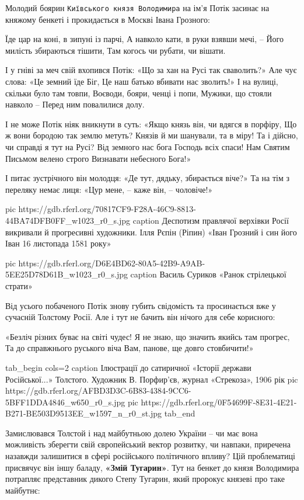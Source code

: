 Молодий боярин \verb|Київського князя Володимира| на ім’я Потік засинає на княжому
бенкеті і прокидається в Москві Івана Грозного:

\begin{multicols}{2}
  \obeycr
Їде цар на коні, в зипуні із парчі,
А навколо кати, в руки взявши мечі, –
Його милість збираються тішити,
Там когось чи рубати, чи вішати.

І у гніві за меч свій вхопився Потік:
«Що за хан на Русі так сваволить?»
Але чує слова: «Це земний їде Біг,
Це наш батько вбивати нас зволить!»
І на вулиці, скільки було там товпи,
Воєводи, бояри, ченці і попи,
Мужики, що стояли навколо –
Перед ним повалилися долу.

І не може Потік ніяк вникнути в суть:
«Якщо князь він, чи вдягся в порфіру,
Що ж вони бородою так землю метуть?
Князів й ми шанували, та в міру!
Та і дійсно, чи справді я тут на Русі?
Від земного нас бога Господь всіх спаси!
Нам Святим Письмом велено строго
Визнавати небесного Бога!»

І питає зустрічного він молодця:
«Де тут, дядьку, збирається віче?»
Та на тім з переляку немає лиця:
«Цур мене, – каже він, – чоловіче!»
  \restorecr
\end{multicols}

\ifcmt
pic https://gdb.rferl.org/70817CF9-F28A-46C9-8813-44BA74DFB0FF_w1023_r0_s.jpg
caption Деспотизм правлячої верхівки Росії викривали й прогресивні художники. Ілля Рєпін (Ріпин) «Іван Грозний і син його Іван 16 листопада 1581 року»
\fi

\ifcmt
pic https://gdb.rferl.org/D6E4BD62-80A5-42B9-A9AB-5EE25D78D61B_w1023_r0_s.jpg
caption Василь Суриков «Ранок стрілецької страти» 
\fi

Від усього побаченого Потік знову губить свідомість та просинається вже у
сучасній Толстому Росії. Але і тут не бачить він нічого для себе корисного:

\obeycr
«Безліч різних буває на світі чудес!
Я не знаю, що значить якийсь там прогрес,
Та до справжнього руського віча
Вам, панове, ще довго стовбичити!»
\restorecr

\ifcmt
tab_begin cols=2
  caption Ілюстрації до сатиричної «Історії держави Російської...» Толстого. Художник В. Порфир’єв, журнал «Стрекоза», 1906 рік
  pic https://gdb.rferl.org/AFBD3D3C-6B83-4384-9CC6-5BFF1DDA4846_w650_r0_s.jpg
  pic https://gdb.rferl.org/0F54699F-8E31-4E21-B271-BE503D9513EE_w1597_n_r0_st.jpg
tab_end
\fi

Замислювався Толстой і над майбутньою долею України – чи має вона можливість
зберегти свій європейський вектор розвитку, чи навпаки, приречена назавжди
залишитися в сфері російського політичного впливу? Цій проблематиці присвячує
він іншу баладу, \textbf{«Змій Тугарин»}. Тут на бенкет до князя Володимира
потрапляє представник дикого Степу Тугарин, який пророкує князеві про таке
майбутнє:

